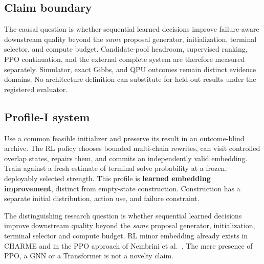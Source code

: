 \subsection*{Claim boundary}
The causal question is whether sequential learned decisions improve failure-aware downstream quality beyond the \emph{same} proposal generator, initialization, terminal selector, and compute budget. Candidate-pool headroom, supervised ranking, PPO continuation, and the external complete system are therefore measured separately. Simulator, exact Gibbs, and QPU outcomes remain distinct evidence domains. No architecture definition can substitute for held-out results under the registered evaluator.

\subsection*{Profile-I system}
Use a common feasible initializer and preserve its result in an outcome-blind archive. The RL policy chooses bounded multi-chain rewrites, can visit controlled overlap states, repairs them, and commits an independently valid embedding. Train against a fresh estimate of terminal solve probability at a frozen, deployably selected strength. This profile is \textbf{learned embedding improvement}, distinct from empty-state construction. Construction has a separate initial distribution, action use, and failure constraint.

The distinguishing research question is whether sequential learned decisions improve downstream quality beyond the \emph{same} proposal generator, initialization, terminal selector and compute budget. RL minor embedding already exists in CHARME and in the PPO approach of Nembrini et al.\ \cite{charme2024,nembrini2026}. The mere presence of PPO, a GNN or a Transformer is not a novelty claim.
